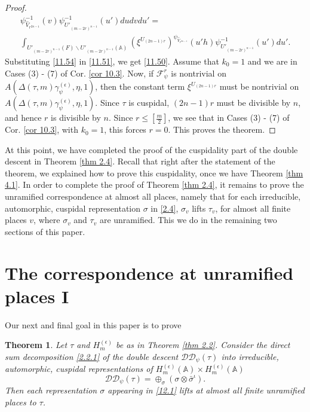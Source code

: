 \documentclass[12pts]{amsart}
\newcommand{\BA}{{\mathbb {A}}}
\newtheorem{thm}{Theorem}[section]
\begin{document}
\begin{proof}
\begin{multline}
 \psi_{\hat{V}_{r^{2n-1}}}^{-1}(v)\psi_{U'_{(m-2r)^{n-1}}}^{-1}(u')dudvdu'=\\
  \int_{U'_{(m-2r)^{n-1}}(F)\backslash U'_{(m-2r)^{n-1}}(\BA)}(\xi^{U_{(2n-1)r}})^{\psi_{\hat{V}_{r^{2n-1}}}}(u'h)\psi_{U'_{(m-2r)^{n-1}}}^{-1}(u')du'.
  \end{multline}
 Substituting \eqref{11.54} in \eqref{11.51}, we get \eqref{11.50}. Assume that $k_0=1$ and we are in Cases (3) - (7) of Cor. \ref{cor 10.3}. Now, if $\mathcal{F}^r_\psi$ is nontrivial  on $A(\Delta(\tau,m)\gamma_\psi^{(\epsilon)},\eta, 1)$, then the constant term $\xi^{U_{(2n-1)r}}$ must be nontrivial on $A(\Delta(\tau,m)\gamma_\psi^{(\epsilon)},\eta, 1)$. Since $\tau$ is cuspidal, $(2n-1)r$ must be divisible by $n$, and hence $r$ is divisible by $n$. Since $r\leq [\frac{m}{2}]$, we see that in Cases (3) - (7) of Cor. \ref{cor 10.3}, with $k_0=1$, this forces $r=0$. This proves the theorem.                                      
\end{proof}

At this point, we have completed the proof of the cuspidality part of the double descent in Theorem \ref{thm 2.4}. Recall that right after the statement of the theorem, we explained how to prove this cuspidality, once we have Theorem \ref{thm 4.1}. In order to complete the proof of Theorem \ref{thm 2.4}, it remains to prove the unramified correspondence at almost all places, namely that
for each irreducible, automorphic, cuspidal representation $\sigma$ in \eqref{2.4}, $\sigma_v$ lifts  $\tau_v$, for almost all finite places $v$, where $\sigma_v$ and $\tau_v$ are unramified. This we do in the remaining two sections of this paper.


\section{The correspondence at unramified places I}

Our next and final goal in this paper is to prove
\begin{thm}\label{thm 12.1}
Let $\tau$ and $H^{(\epsilon)}_m$ be as in Theorem \ref{thm 2.2}. Consider the direct sum decomposition \eqref{2.2.1} of the double descent $\mathcal{D}\mathcal{D}_\psi(\tau)$ into irreducible, automorphic, cuspidal representations of $H^{(\epsilon)}_m(\BA)\times H^{(\epsilon)}_m(\BA)$
\begin{equation}\label{12.1}
\mathcal{D}\mathcal{D}_\psi(\tau)=\oplus_\sigma (\sigma\otimes \bar{\sigma}^\iota).
\end{equation}
Then each representation $\sigma$ appearing in \eqref{12.1} lifts at almost all finite unramified places to $\tau$.
\end{thm}
\end{document}
